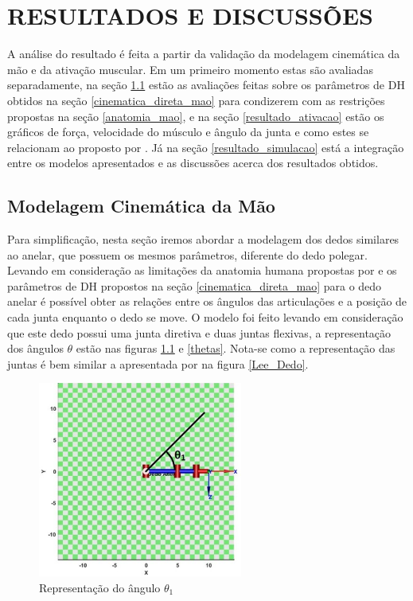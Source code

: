 
\chapter{RESULTADOS E DISCUSSÕES}\label{cap4}
A análise do resultado é feita a partir da validação da modelagem cinemática da mão e da ativação muscular. Em um primeiro momento estas são avaliadas separadamente, na seção \ref{resultado_cinematica} estão as avaliações feitas sobre os parâmetros de DH obtidos na seção \ref{cinematica_direta_mao} para condizerem com as restrições propostas na seção \ref{anatomia_mao}, e na seção \ref{resultado_ativacao} estão os gráficos de força, velocidade do músculo e ângulo da junta e como estes se relacionam ao proposto por \cite{zajac1989muscle}. Já na seção \ref{resultado_simulacao} está a integração entre os modelos apresentados e as discussões acerca dos resultados obtidos.
\section{Modelagem Cinemática da Mão}
\label{resultado_cinematica}
Para simplificação, nesta seção iremos abordar a modelagem dos dedos similares ao anelar, que possuem os mesmos parâmetros, diferente do dedo polegar. Levando em consideração as limitações da anatomia humana propostas por \cite{lin2000modeling} e os parâmetros de DH propostos na seção \ref{cinematica_direta_mao} para o dedo anelar é possível obter as relações entre os ângulos das articulações e a posição de cada junta enquanto o dedo se move. O modelo foi feito levando em consideração que este dedo possui uma junta diretiva e duas juntas flexivas, a representação dos ângulos $\theta$ estão nas figuras \ref{theta1} e \ref{thetas}. Nota-se como a representação das juntas é bem similar a apresentada por \cite{lee1995model} na figura \ref{Lee_Dedo}.

\begin{figure}[H]
\centering
\includegraphics[width = 0.6\textwidth]{img/theta1.jpg}
\caption[Representação do ângulo $\theta_1$]{Representação do ângulo $\theta_1$}
\label{theta1}
\end{figure}

